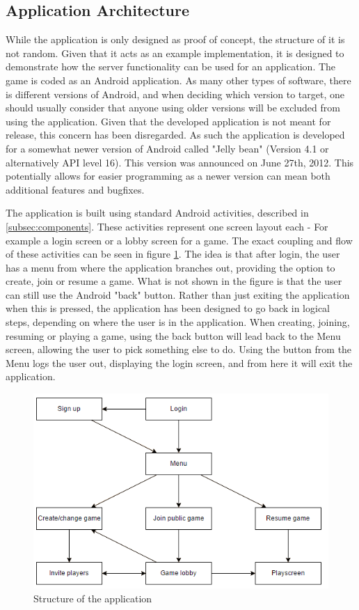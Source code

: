 \subsection{Application Architecture}
\label{sec:application_architecture}
While the application is only designed as proof of concept, the structure of it is not random. Given that it acts as an example implementation, it is designed to demonstrate how the server functionality can be used for an application. The game is coded as an Android application. As many other types of software, there is different versions of Android, and when deciding which version to target, one should usually consider that anyone using older versions will be excluded from using the application. Given that the developed application is not meant for release, this concern has been disregarded. As such the application is developed for a somewhat newer version of Android called "Jelly bean" (Version 4.1 or alternatively API level 16). This version was announced on June 27th, 2012\cite{jelly-bean}. This potentially allows for easier programming as a newer version can mean both additional features and bugfixes.

The application is built using standard Android activities, described in \ref{subsec:components}. These activities represent one screen layout each - For example a login screen or a lobby screen for a game. The exact coupling and flow of these activities can be seen in figure \ref{fig:appstructure}. The idea is that after login, the user has a menu from where the application branches out, providing the option to create, join or resume a game.
What is not shown in the figure is that the user can still use the Android "back" button. Rather than just exiting the application when this is pressed, the application has been designed to go back in logical steps, depending on where the user is in the application. When creating, joining, resuming or playing a game, using the back button will lead back to the Menu screen, allowing the user to pick something else to do. Using the button from the Menu logs the user out, displaying the login screen, and from here it will exit the application.

\begin{figure}[H]
\centering
\includegraphics[width=\textwidth]{billeder/appstructure.png}
\caption{Structure of the application}
\label{fig:appstructure}
\end{figure}

